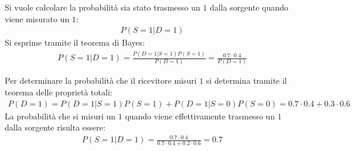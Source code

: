 \documentclass{article}
\begin{document}
Si vuole calcolare la probabilità sia stato trasmesso un $1$ dalla sorgente quando viene misurato un $1$:
\begin{gather*}
    P(S=1|D=1)
\end{gather*}
Si esprime tramite il teorema di Bayes:
\begin{gather*}
    P(S=1|D=1)=\displaystyle\frac{P(D=1|S=1)P(S=1)}{P(D=1)}=\frac{0.7\cdot0.4}{P(D=1)}
\end{gather*}

Per determinare la probabilità che il ricevitore misuri $1$ si determina tramite il teorema delle proprietà totali:
\begin{gather*}
    P(D=1)=P(D=1|S=1)P(S=1)+P(D=1|S=0)P(S=0)=0.7\cdot0.4+0.3\cdot0.6
\end{gather*}
La probabilità che si misuri un $1$ quando viene effettivamente trasmesso un $1$ dalla sorgente risulta essere:
\begin{gather}
    P(S=1|D=1)=\displaystyle\frac{0.7\cdot0.4}{0.7\cdot0.4+0.2\cdot0.6}=0.7
\end{gather}
\end{document}
